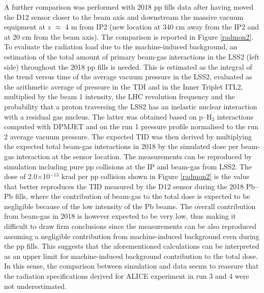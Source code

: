 \noindent A further comparison was performed with 2018 pp fills data after having moved the D12 sensor closer to the beam axis and downstream the massive vacuum equipment at $z$ $\approx$ 4 m from IP2 (new location at 340 cm away from the IP2 and at 20 cm from the beam axis). The comparison is reported in Figure \ref{radmon2}. To evaluate the radiation load due to the machine-induced background, an estimation of the total amount of primary beam-gas interactions in the LSS2 (left side) throughout the 2018 pp fills is needed. This is estimated as the integral of the trend versus time of the average vacuum pressure in the LSS2, evaluated as the arithmetic average of pressure in the TDI and in the Inner Triplet ITL2, multiplied by the beam 1 intensity, the LHC revolution frequency and the probability that a proton traversing the LSS2 has an inelastic nuclear interaction with a residual gas nucleus. The latter was obtained based on p--H$_2$ interactions computed with DPMJET and on the {\sc run} 1 pressure profile normalised to the {\sc run} 2 average vacuum pressure. The expected TID was then derived by multiplying the expected total beam-gas interactions in 2018 by the simulated dose per beam-gas interaction at the sensor location. 
The measurements can be reproduced by simulation including pure pp collisions at the IP and beam-gas from LSS2. 
The dose of 2.0$\times$10$^{-13}$ krad per pp collision shown in Figure \ref{radmon2} is the value that better reproduces the TID measured by the D12 sensor during the 2018 Pb--Pb fills, where the contribution of beam-gas to the total dose is expected to be negligible because of the low intensity of the Pb beams.
The overall contribution from beam-gas in 2018 is however expected to be very low, thus making it difficult to draw firm conclusions since the measurements can be also reproduced assuming a negligible contribution from machine-induced background even during the pp fills. This suggests that the aforementioned calculations can be interpreted as an upper limit for machine-induced background contribution to the total dose.
In this sense, the comparison between simulation and data seems to reassure that the radiation specifications derived for ALICE experiment in {\sc run} 3 and 4 were not underestimated.


